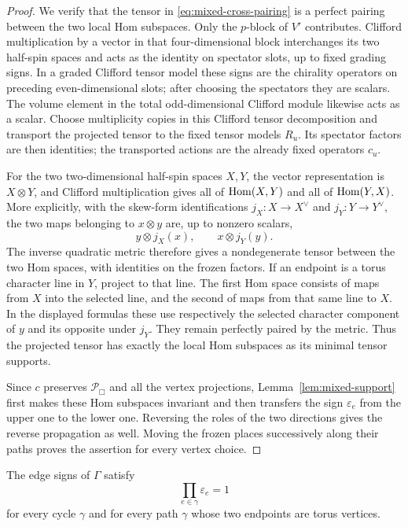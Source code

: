 \begin{proof}
We verify that the tensor in \eqref{eq:mixed-cross-pairing} is a
perfect pairing between the two local Hom subspaces.  Only the
$p$-block of $V'$ contributes.  Clifford multiplication by a vector
in that four-dimensional block interchanges its two half-spin
spaces and acts as the identity on spectator slots, up to fixed
grading signs.  In a graded Clifford tensor model these signs are
the chirality operators on preceding even-dimensional slots; after
choosing the spectators they are scalars.  The volume element in
the total odd-dimensional Clifford module likewise acts as a
scalar.  Choose multiplicity copies in this Clifford tensor
decomposition and transport the projected tensor to the fixed
tensor models $R_u$.  Its spectator factors are then identities;
the transported actions are the already fixed operators $c_u$.

For the two two-dimensional half-spin spaces $X,Y$, the vector
representation is $X\otimes Y$, and Clifford multiplication gives
all of $\operatorname{Hom}(X,Y)$ and all of $\operatorname{Hom}(Y,X)$.  More explicitly, with
the skew-form identifications $j_X:X\to X^\vee$ and
$j_Y:Y\to Y^\vee$, the two maps belonging to $x\otimes y$ are,
up to nonzero scalars,
\[
 y\otimes j_X(x),\qquad x\otimes j_Y(y).
\]
The inverse quadratic metric therefore gives a nondegenerate tensor
between the two Hom spaces, with identities on the frozen factors.
If an endpoint is a torus character line in $Y$, project to that
line.  The first Hom space consists of maps from $X$ into the selected
line, and the second of maps from that same line to $X$.  In the
displayed formulas these use respectively the selected character
component of $y$ and its opposite under $j_Y$.  They remain perfectly
paired by the metric.  Thus the projected tensor has
exactly the local Hom subspaces as its minimal tensor supports.

Since $c$ preserves $\mathcal P_{\Box}$ and all the vertex
projections, Lemma~\ref{lem:mixed-support} first makes these Hom
subspaces invariant and then transfers the sign $\varepsilon_e$
from the upper one to the lower one.  Reversing the roles of the
two directions gives the reverse propagation as well.  Moving the
frozen places successively along their paths proves the assertion
for every vertex choice.
\end{proof}

\begin{lemma}\label{lem:mixed-cycle}
The edge signs of $\Gamma$ satisfy
\begin{equation}\label{eq:mixed-cycle-signs}
 \prod_{e\in\gamma}\varepsilon_e=1
\end{equation}
for every cycle $\gamma$ and for every path $\gamma$ whose two
endpoints are torus vertices.
\end{lemma}

